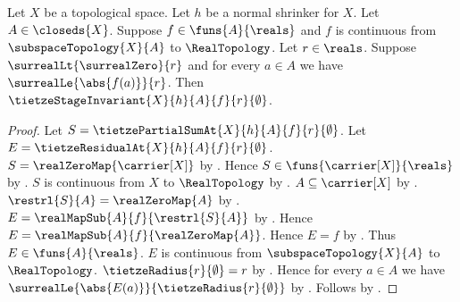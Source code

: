 \begin{theorem}\label{tietze_stage_invariant_zero}
    Let $X$ be a topological space.
    Let $h$ be a normal shrinker for $X$.
    Let $A\in\closeds{X}$.
    Suppose $f\in\funs{A}{\reals}$ and
        $f$ is continuous from $\subspaceTopology{X}{A}$ to
            $\RealTopology$.
    Let $r\in\reals$.
    Suppose $\surrealLt{\surrealZero}{r}$ and
        for every $a\in A$ we have $\surrealLe{\abs{f(a)}}{r}$.
    Then $\tietzeStageInvariant{X}{h}{A}{f}{r}{\emptyset}$.
\end{theorem}
\begin{proof}
    Let $S=\tietzePartialSumAt{X}{h}{A}{f}{r}{\emptyset}$.
    Let $E=\tietzeResidualAt{X}{h}{A}{f}{r}{\emptyset}$.
    $S=\realZeroMap{\carrier[X]}$ by .
    Hence $S\in\funs{\carrier[X]}{\reals}$
        by .
    $S$ is continuous from $X$ to $\RealTopology$
        by .
    $A\subseteq\carrier[X]$ by .
    $\restrl{S}{A}=\realZeroMap{A}$
        by .
    $E=\realMapSub{A}{f}{\restrl{S}{A}}$
        by .
    Hence $E=\realMapSub{A}{f}{\realZeroMap{A}}$.
    Hence $E=f$ by .
    Thus $E\in\funs{A}{\reals}$.
    $E$ is continuous from $\subspaceTopology{X}{A}$ to
        $\RealTopology$.
    $\tietzeRadius{r}{\emptyset}=r$ by .
    Hence for every $a\in A$ we have
        $\surrealLe{\abs{E(a)}}{\tietzeRadius{r}{\emptyset}}$
        by \auto.
    Follows by
        .
\end{proof}


